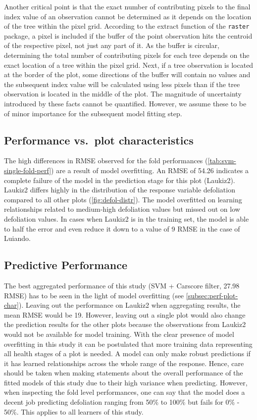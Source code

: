 \documentclass[letterpaper, peerreview]{IEEEtran}
\begin{document}
Another critical point is that the exact number of contributing pixels to the final index value of an observation cannot be determined as it depends on the location of the tree within the pixel grid.
According to the extract function of the \texttt{raster} package, a pixel is included if the buffer of the point observation hits the centroid of the respective pixel, not just any part of it.
As the buffer is circular, determining the total number of contributing pixels for each tree depends on the exact location of a tree within the pixel grid.
Next, if a tree observation is located at the border of the plot, some directions of the buffer will contain no values and the subsequent index value will be calculated using less pixels than if the tree observation is located in the middle of the plot.
The magnitude of uncertainty introduced by these facts cannot be quantified.
However, we assume these to be of minor importance for the subsequent model fitting step.

\subsection{Performance vs.\ plot characteristics}
\label{subsec:perf-plot-char}

\noindent The high differences in RMSE observed for the fold performances (\autoref{tab:svm-single-fold-perf}) are a result of model overfitting.
An RMSE of 54.26 indicates a complete failure of the model in the prediction stage for this plot (Laukiz2).
Laukiz2 differs highly in the distribution of the response variable defoliation compared to all other plots (\autoref{fig:defol-distr}).
The model overfitted on learning relationships related to medium-high defoliation values but missed out on low defoliation values.
In cases when Laukiz2 is in the training set, the model is able to half the error and even reduce it down to a value of 9 RMSE in the case of Luiando.

\subsection{Predictive Performance}
The best aggregated performance of this study (SVM + Carscore filter, 27.98 RMSE) has to be seen in the light of model overfitting (see \autoref{subsec:perf-plot-char}).
Leaving out the performance on Laukiz2 when aggregating results, the mean RMSE would be 19.
However, leaving out a single plot would also change the prediction results for the other plots because the observations from Laukiz2 would not be available for model training.
With the clear presence of model overfitting in this study it can be postulated that more training data representing all health stages of a plot is needed.
A model can only make robust predictions if it has learned relationships across the whole range of the response.
Hence, care should be taken when making statements about the overall performance of the fitted models of this study due to their high variance when predicting.
However, when inspecting the fold level performances, one can say that the model does a decent job predicting defoliation ranging from 50\% to 100\% but fails for 0\% - 50\%.
This applies to all learners of this study.
\end{document}

